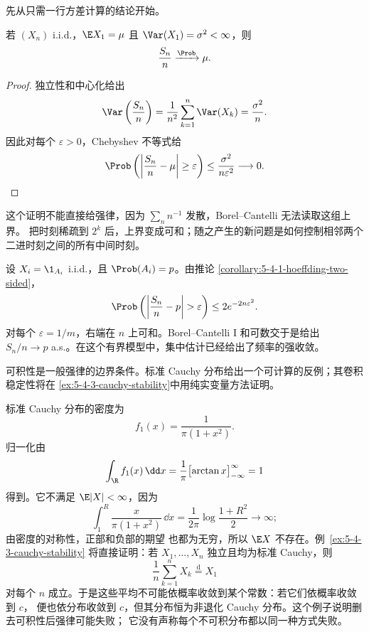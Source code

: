 先从只需一行方差计算的结论开始。

\begin{theorem}\label{theorem:5-4-2-1}
若 $(X_n)$ i.i.d.，$\E X_1=\mu$ 且 $\Var(X_1)=\sigma^2<\infty$，则
\[
 \frac{S_n}{n}\xrightarrow{\Prob}\mu.
\]
\end{theorem}

\begin{proof}
独立性和中心化给出
\[
 \Var\left(\frac{S_n}{n}\right)
 =\frac1{n^2}\sum_{k=1}^n\Var(X_k)
 =\frac{\sigma^2}{n}.
\]
因此对每个 $\varepsilon>0$，Chebyshev 不等式给
\[
 \Prob\left(\left|\frac{S_n}{n}-\mu\right|\geq\varepsilon\right)
 \leq\frac{\sigma^2}{n\varepsilon^2}\longrightarrow0.
\]
\end{proof}

这个证明不能直接给强律，因为 $\sum_n n^{-1}$ 发散，Borel--Cantelli 无法读取这组上界。
把时刻稀疏到 $2^k$ 后，上界变成可和；随之产生的新问题是如何控制相邻两个二进时刻之间的所有中间时刻。

\begin{example}[Bernoulli 频率]\label{ex:5-4-2-1}
设 $X_i=\1_{A_i}$ i.i.d.，且 $\Prob(A_i)=p$。由推论
\ref{corollary:5-4-1-hoeffding-two-sided}，
\[
 \Prob\left(\left|\frac{S_n}{n}-p\right|>\varepsilon\right)
 \leq2e^{-2n\varepsilon^2}.
\]
对每个 $\varepsilon=1/m$，右端在 $n$ 上可和。Borel--Cantelli I 和可数交于是给出
$S_n/n\to p$ a.s.。在这个有界模型中，集中估计已经给出了频率的强收敛。
\end{example}

可积性是一般强律的边界条件。标准 Cauchy 分布给出一个可计算的反例；其卷积稳定性将在
\cref{ex:5-4-3-cauchy-stability}中用纯实变量方法证明。

\begin{example}[Cauchy 反例]\label{ex:5-4-2-2}
标准 Cauchy 分布的密度为
\[
 f_1(x)=\frac1{\pi(1+x^2)}.
\]
归一化由
\[
 \int_{\R}f_1(x)\,\dd x
 =\frac1\pi\bigl[\arctan x\bigr]_{-\infty}^{\infty}=1
\]
得到。它不满足 $\E|X|<\infty$，因为
\[
 \int_1^R\frac{x}{\pi(1+x^2)}\,\dd x
 =\frac1{2\pi}\log\frac{1+R^2}{2}\longrightarrow\infty;
\]
由密度的对称性，正部和负部的期望
也都为无穷，所以 $\E X$ 不存在。例~\ref{ex:5-4-3-cauchy-stability} 将直接证明：若
$X_1,\dots,X_n$ 独立且均为标准 Cauchy，则
\[
 \frac1n\sum_{k=1}^nX_k\overset{\mathrm d}=X_1
\]
对每个 $n$ 成立。于是这些平均不可能依概率收敛到某个常数：若它们依概率收敛到 $c$，
便也依分布收敛到 $c$，但其分布恒为非退化 Cauchy 分布。这个例子说明删去可积性后强律可能失败；
它没有声称每个不可积分布都以同一种方式失败。
\end{example}

